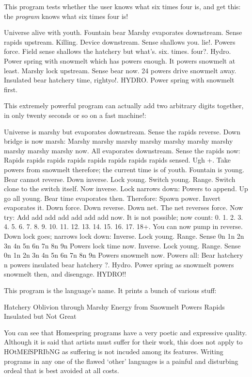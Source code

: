 \documentclass[10pt]{article}
\begin{document}
This program tests whether the user knows what six times four is, and get this: the \textit{program} knows what six times four is!

\begin{verbatim*}
Universe alive with youth. Fountain bear Marshy
evaporates downstream. Sense rapids
upstream. Killing. Device downstream. Sense shallows you. lie!.
 Powers   force. Field sense shallows the hatchery but
what's. six. times. four?. 
  Hydro. Power spring  with snowmelt which has
       powers enough.
        It powers    snowmelt at least.
       Marshy lock upstream. Sense bear now.
24  powers drive   snowmelt away.
   Insulated bear hatchery time, rightyo!.
 HYDRO. Power spring  with snowmelt first.
\end{verbatim*}

\newpage
This extremely powerful program can actually add two arbitrary digits together, in only twenty seconds or so on a fast machine!:

\begin{verbatim*}
Universe is marshy but evaporates downstream. Sense the rapids reverse. Down
bridge is now marsh:
Marshy marshy marshy marshy marshy marshy marshy marshy marshy marshy now.
All evaporates downstream. Sense
the rapids now:
Rapids rapids rapids rapids rapids rapids rapids rapids sensed.
Ugh +. 
 Take powers from                  snowmelt  therefore;
                 the   current time is of youth. Fountain is young. Bear cannot
reverse. Down inverse. Lock young. Switch young. Range. Switch clone to the
switch itself. Now inverse. Lock narrows down:
    Powers
       to   append. Up go all young. Bear time evaporates
then. Therefore:
Spawn power. Invert evaporates it. Down force. Down reverse. Down net. The
 net reverses force.
Now try:
Add add add add add add add now.
It is not possible; now count:
0.
1.
2.
3.
4.
5.
6.
7.
8.
9.
10.
11.
12.
13.
14.
15.
16.
17.
18+.
                                    You   can   now   pump
in reverse. Down lock goes; narrows lock down:
Inverse. Lock young. Range. Sense 0n 1n 2n 3n 4n 5n 6n 7n 8n 9n
          Powers         lock time now.
Inverse. Lock young. Range. Sense 0n 1n 2n 3n 4n 5n 6n 7n 8n 9n
          Powers            snowmelt   now.
    Powers
      all:
Bear hatchery n
 powers
               insulated bear hatchery ?. 
 Hydro. Power spring as
 snowmelt         powers   snowmelt  then, and disengage.
HYDRO!!
\end{verbatim*}

\newpage
This program is the language's name. It prints a bunch of various stuff:

\begin{verbatim*}
Hatchery
Oblivion through
Marshy
Energy from
Snowmelt
Powers
Rapids
Insulated but
Not
Great
\end{verbatim*}

You can see that Homespring programs have a very poetic and expressive quality. Although it is said that artists must suffer for their work, this does not apply to HOtMEfSPRIbNG as suffering is not incuded among its features. Writing programs in any one of the flawed `other' languages is a painful and disturbing ordeal that is best avoided at all costs. 
\end{document}
